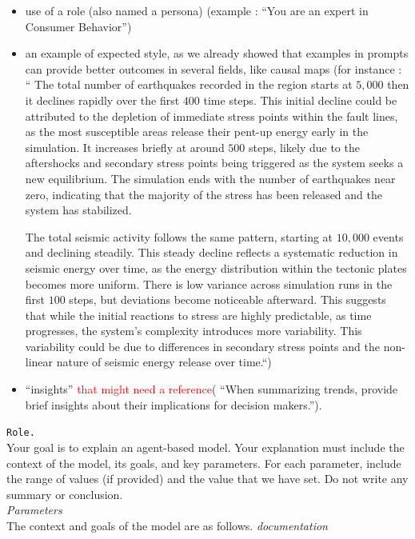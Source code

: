 \documentclass[preprint,12pt]{elsarticle}
\begin{document}
\begin{itemize}
    \item use of a role (also named a persona) \cite{White2023} \cite{Stahl2024} (example : “You are an expert in Consumer Behavior”)
    \item an example of expected style, as we already showed that examples in prompts can provide better outcomes in several fields, like causal maps \cite{Giabbanelli202444}  (for instance : “ The total number of earthquakes recorded in the region starts at $5,000$ then it declines rapidly over the first $400$ time steps. This initial decline could be attributed to the depletion of immediate stress points within the fault lines, as the most susceptible areas release their pent-up energy early in the simulation. It increases briefly at around $500$ steps, likely due to the aftershocks and secondary stress points being triggered as the system seeks a new equilibrium. The simulation ends with the number of earthquakes near zero, indicating that the majority of the stress has been released and the system has stabilized.

    The total seismic activity follows the same pattern, starting at $10,000$ events and declining steadily. This steady decline reflects a systematic reduction in seismic energy over time, as the energy distribution within the tectonic plates becomes more uniform. There is low variance across simulation runs in the first $100$ steps, but deviations become noticeable afterward. This suggests that while the initial reactions to stress are highly predictable, as time progresses, the system's complexity introduces more variability. This variability could be due to differences in secondary stress points and the non-linear nature of seismic energy release over time.“)
    \item “insights” \textcolor{red}{that might need a reference}( “When summarizing trends, provide brief insights about their implications for decision makers.”).
\end{itemize}




\begin{tcolorbox}[colback=white!95!gray, colframe=black, title=Prompt 1 : \texttt{text} is a feature from the design of experiment. \textit{text} is a part of the prompt changing according to the model and the experiment. Complete prompts can be found in the supplementary material file. , label=box:prompt1]
\texttt{Role.}\\

Your goal is to explain an agent-based model. Your explanation must include the context of the model, its goals, and key parameters. For each parameter, include the range of values (if provided) and the value that we have set. Do not write any summary or conclusion.\\

\textit{Parameters}\\


The context and goals of the model are as follows. \textit{documentation}

\end{tcolorbox}
\end{document}

